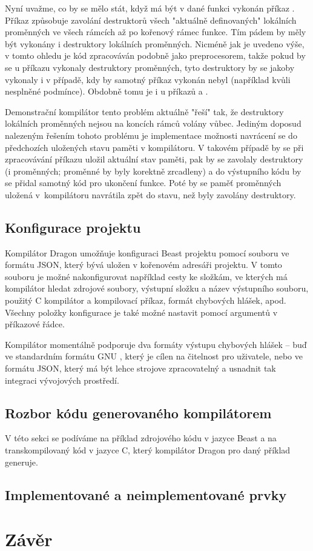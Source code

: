 Nyní uvažme, co by se mělo stát, když má být v dané funkci vykonán příkaz . Příkaz  způsobuje zavolání destruktorů všech "aktuálně definovaných" lokálních proměnných ve všech rámcích až po kořenový rámec funkce. Tím pádem by měly být vykonány i destruktory lokálních \ctime proměnných. Nicméně jak je uvedeno výše, v tomto ohledu je \ctime kód zpracováván podobně jako preprocesorem, takže pokud by se u příkazu  vykonaly destruktory \ctime proměnných, tyto destruktory by se jakoby vykonaly i v případě, kdy by samotný příkaz  vykonán nebyl (například kvůli nesplněné podmínce). Obdobně tomu je i u příkazů  a .

Demonstrační kompilátor tento problém aktuálně "řeší" tak, že destruktory lokálních \ctime proměnných nejsou na koncích rámců volány vůbec. Jediným doposud nalezeným řešením tohoto problému je implementace možnosti navrácení se do předchozích uložených stavu \ctime paměti v kompilátoru. V takovém případě by se při zpracovávání příkazu  uložil aktuální stav paměti, pak by se zavolaly destruktory (\nonctime i \ctime proměnných; \ctime proměnné by byly korektně zrcadleny) a do výstupního kódu by se přidal samotný kód pro ukončení funkce. Poté by se paměť \ctime proměnných uložená v~kompilátoru navrátila zpět do stavu, než byly zavolány destruktory.

\section{Konfigurace projektu}
Kompilátor Dragon umožňuje konfiguraci Beast projektu pomocí souboru  ve formátu JSON, který bývá uložen v kořenovém adresáři projektu. V tomto souboru je možné nakonfigurovat například cesty ke složkám, ve kterých má kompilátor hledat zdrojové soubory, výstupní složku a název výstupního souboru, použitý C kompilátor a kompilovací příkaz, formát chybových hlášek, apod. Všechny položky konfigurace je také možné nastavit pomocí argumentů v příkazové řádce.

Kompilátor momentálně podporuje dva formáty výstupu chybových hlášek -- buď ve standardním formátu GNU \cite{GNUErrors}, který je cílen na čitelnost pro uživatele, nebo ve formátu JSON, který má být lehce strojove zpracovatelný a usnadnit tak integraci vývojových prostředí.

\section{Rozbor kódu generovaného kompilátorem}
V této sekci se podíváme na příklad zdrojového kódu v jazyce Beast a na transkompilovaný kód v jazyce C, který kompilátor Dragon pro daný příklad generuje.

\section{Implementované a neimplementované prvky}

\chapter{Závěr}
